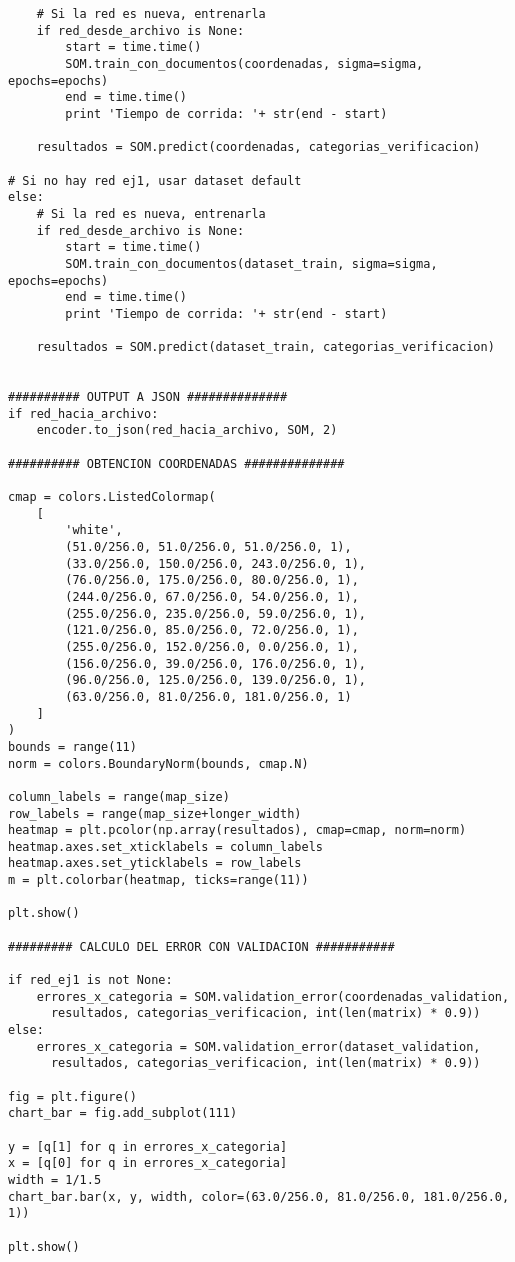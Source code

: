 \begin{changemargin}{-2.0cm}{-1.5cm}
\begin{verbatim}
    # Si la red es nueva, entrenarla
    if red_desde_archivo is None:
        start = time.time()
        SOM.train_con_documentos(coordenadas, sigma=sigma, epochs=epochs)
        end = time.time()
        print 'Tiempo de corrida: '+ str(end - start)

    resultados = SOM.predict(coordenadas, categorias_verificacion)

# Si no hay red ej1, usar dataset default
else:
    # Si la red es nueva, entrenarla
    if red_desde_archivo is None:
        start = time.time()
        SOM.train_con_documentos(dataset_train, sigma=sigma, epochs=epochs)
        end = time.time()
        print 'Tiempo de corrida: '+ str(end - start)

    resultados = SOM.predict(dataset_train, categorias_verificacion)


########## OUTPUT A JSON ##############
if red_hacia_archivo:
    encoder.to_json(red_hacia_archivo, SOM, 2)

########## OBTENCION COORDENADAS ##############

cmap = colors.ListedColormap(
    [
        'white', 
        (51.0/256.0, 51.0/256.0, 51.0/256.0, 1), 
        (33.0/256.0, 150.0/256.0, 243.0/256.0, 1),
        (76.0/256.0, 175.0/256.0, 80.0/256.0, 1),
        (244.0/256.0, 67.0/256.0, 54.0/256.0, 1),
        (255.0/256.0, 235.0/256.0, 59.0/256.0, 1),
        (121.0/256.0, 85.0/256.0, 72.0/256.0, 1),
        (255.0/256.0, 152.0/256.0, 0.0/256.0, 1),
        (156.0/256.0, 39.0/256.0, 176.0/256.0, 1),
        (96.0/256.0, 125.0/256.0, 139.0/256.0, 1),
        (63.0/256.0, 81.0/256.0, 181.0/256.0, 1)
    ]
)
bounds = range(11)
norm = colors.BoundaryNorm(bounds, cmap.N)

column_labels = range(map_size)
row_labels = range(map_size+longer_width)
heatmap = plt.pcolor(np.array(resultados), cmap=cmap, norm=norm)
heatmap.axes.set_xticklabels = column_labels
heatmap.axes.set_yticklabels = row_labels
m = plt.colorbar(heatmap, ticks=range(11))

plt.show()

######### CALCULO DEL ERROR CON VALIDACION ###########

if red_ej1 is not None:
    errores_x_categoria = SOM.validation_error(coordenadas_validation, 
      resultados, categorias_verificacion, int(len(matrix) * 0.9))
else:
    errores_x_categoria = SOM.validation_error(dataset_validation, 
      resultados, categorias_verificacion, int(len(matrix) * 0.9))

fig = plt.figure()
chart_bar = fig.add_subplot(111)

y = [q[1] for q in errores_x_categoria]
x = [q[0] for q in errores_x_categoria]
width = 1/1.5
chart_bar.bar(x, y, width, color=(63.0/256.0, 81.0/256.0, 181.0/256.0, 1))

plt.show()

\end{verbatim}
\end{changemargin}


